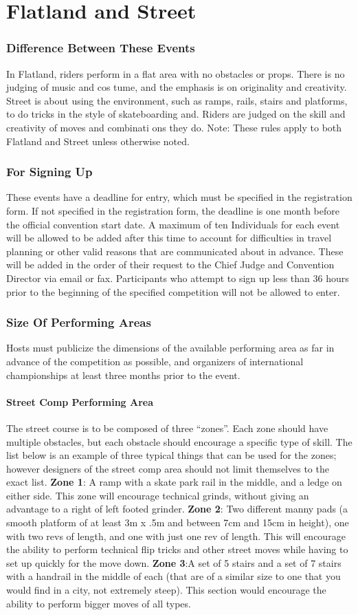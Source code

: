 \part{Flatland and Street}
\section{Difference Between These Events}
In Flatland, riders perform in a flat area with no obstacles or props. There is no judging of music and cos
tume, and the
emphasis is on originality and creativity. Street is about using the environment, such as ramps, rails, stairs and platforms,
to do tricks in the style of skateboarding and. Riders are judged on the skill and creativity of moves and combinati
ons they
do.
Note:
These rules apply to both Flatland and Street unless otherwise noted.
\section{ For Signing Up}
These events have a deadline for entry, which must be specified in the registration form. If not specified in the registration
form, the deadline is one month before the official convention start date. A maximum of ten Individuals for each event will
be allowed to be added after this time to account for difficulties in travel planning or other valid reasons that are communicated about in advance. These will be added in the order of their request to the Chief Judge and Convention Director via email or fax. Participants who attempt to sign up less than 36 hours prior to the beginning of the specified competition will not be allowed to enter.
\section{Size Of Performing Areas }
Hosts must publicize the dimensions of the available performing area as far in advance of the competition as possible, and
organizers of international championships at least three months prior to the event.
\subsection{Street Comp Performing Area}
The street course is to be composed of three “zones”. Each zone should have multiple obstacles, but each obstacle
should encourage a specific type of skill. The list below is an example of three typical things that can be used for the
zones; however designers of the street comp area should not limit themselves to the exact list.
\textbf{Zone 1}: A ramp with a skate park rail in the middle, and a ledge on either side. This zone will encourage technical
grinds, without giving an advantage to a right of left footed grinder.
\textbf{Zone 2}: Two different manny pads (a smooth platform of at least 3m x .5m and between 7cm and 15cm in height), one with two revs of length, and one with just one rev of length. This will encourage the ability to perform technical flip tricks and other street moves while having to set up quickly for the move down.
\textbf{Zone 3}:A set of 5 stairs and a set of 7 stairs with a handrail in the middle of each (that are of a similar size to one that you would find in a city, not extremely steep). This section would encourage the ability to perform bigger moves of all types.
